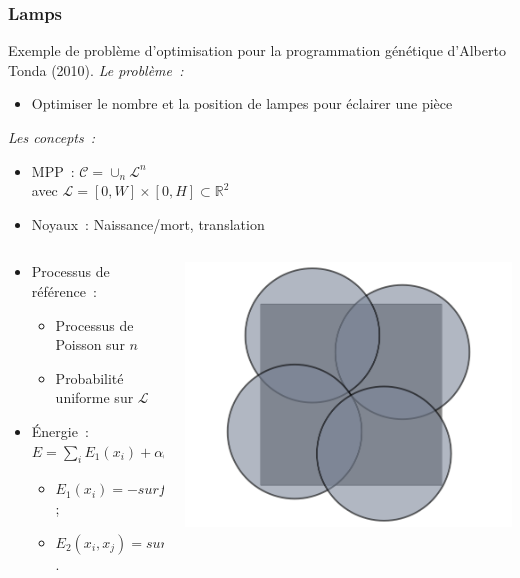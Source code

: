 \documentclass{beamer}
\begin{document}
\begin{frame}
\frametitle{Lamps}
Exemple de problème d'optimisation pour la programmation génétique d'Alberto Tonda (2010).
\emph{Le probl\`eme~:} 
\begin{itemize}
\item Optimiser le nombre et la position de lampes pour éclairer une pièce
\end{itemize}
\emph{Les concepts~:}
\begin{itemize}
\item MPP~:  $\mathcal{C} = \cup_{n}\mathcal{L}^n$\\
avec $\mathcal{L}=[0,W]\times[0,H] \subset  \mathds{R}^{2}$
\item Noyaux~: Naissance/mort, translation
\end{itemize}

\begin{columns}
\begin{column}{0.55\textwidth}
\begin{itemize}
\item Processus de référence~:
\begin{itemize}
\item Processus de Poisson sur $n$
\item Probabilité uniforme sur $\mathcal{L}$
\end{itemize}
\item \'Energie~: $E = \sum_i E_1(x_i) + \alpha_{0} \times \sum_{i<j} E_2(x_i,x_j)$
\begin{itemize}
\item $E_1(x_i) = -surface\_inside\_room(x_i)$ ;
\item $E_2(x_i,x_j) = surface(x_i \cap x_j)$.
\end{itemize}
\end{itemize}
\end{column}
\begin{column}{0.45\textwidth}
\includegraphics[width=\textwidth]{lamps}
\end{column}
\end{columns}
\end{frame}
\end{document}
